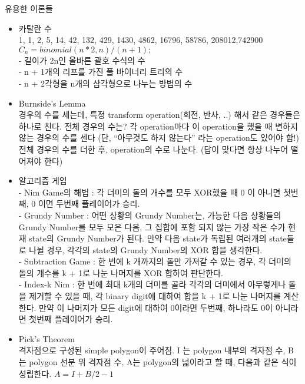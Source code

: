 \documentclass[landscape, 10pt, a4paper, oneside, twocolumn]{extarticle}
\begin{document}
\Algorithm
{유용한 이론들}
{}
{}
{}{}

\begin{itemize}
    \setlength\itemsep{0.1em}
    
\item 카탈란 수\\
1, 1, 2, 5, 14, 42, 132, 429, 1430, 4862, 16796, 58786, 208012,742900\\
$C_n = binomial(n * 2, n) / (n + 1);$\\
- 길이가 2n인 올바른 괄호 수식의 수\\
- n + 1개의 리프를 가진 풀 바이너리 트리의 수\\
- n + 2각형을 n개의 삼각형으로 나누는 방법의 수

\item Burnside’s Lemma\\
경우의 수를 세는데, 특정 transform operation(회전, 반사, ..) 해서 같은 경우들은 하나로 친다. 전체 경우의 수는? 각 operation마다 이 operation을 했을 때 변하지 않는 경우의 수를 센다 (단, “아무것도 하지 않는다” 라는 operation도 있어야 함!) 전체 경우의 수를 더한 후, operation의 수로 나눈다. (답이 맞다면 항상 나누어 떨어져야 한다)

\item 알고리즘 게임\\
- Nim Game의 해법 : 각 더미의 돌의 개수를 모두 XOR했을 때 0 이 아니면 첫번째, 0 이면 두번째 플레이어가 승리.\\
- Grundy Number : 어떤 상황의 Grundy Number는, 가능한 다음 상황들의 Grundy Number를 모두 모은 다음, 그 집합에 포함 되지 않는 가장 작은 수가 현재 state의 Grundy Number가 된다. 만약 다음 state가 독립된 여러개의 state들로 나뉠 경우, 각각의 state의 Grundy Number의 XOR 합을 생각한다.\\
- Subtraction Game : 한 번에 k 개까지의 돌만 가져갈 수 있는 경우, 각 더미의 돌의 개수를 k + 1로 나눈 나머지를 XOR 합하여 판단한다.\\
- Index-k Nim : 한 번에 최대 k개의 더미를 골라 각각의 더미에서 아무렇게나 돌을 제거할 수 있을 때, 각 binary digit에 대하여 합을 k + 1로 나눈 나머지를 계산한다. 만약 이 나머지가 모든 digit에 대하여 0이라면 두번째, 하나라도 0이 아니라면 첫번째 플레이어가 승리.

\item Pick’s Theorem\\
격자점으로 구성된 simple polygon이 주어짐. I 는 polygon 내부의 격자점 수, B 는 polygon 선분 위 격자점 수, A는 polygon의 넓이라고 할 때, 다음과 같은 식이 성립한다. $A=I+B/2-1$


\end{itemize}
\end{document}
